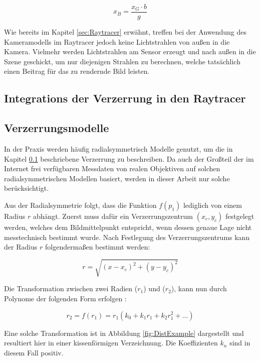 \begin{equation}
x_B = \frac{x_G \cdot b}{g}
\end{equation}

Wie bereits im Kapitel \ref{sec:Raytracer} erwähnt, treffen bei der Anwendung des Kameramodells im Raytracer jedoch keine Lichtstrahlen von außen in die Kamera. Vielmehr werden Lichtstrahlen am Sensor erzeugt und nach außen in die Szene geschickt, um nur diejenigen Strahlen zu berechnen, welche tatsächlich einen Beitrag für das zu rendernde Bild leisten.

\subsection{Integrations der Verzerrung in den Raytracer}\label{sec:DistortionRaytracer}



\subsection{Verzerrungsmodelle}
\label{subsec:verzerrungsmodelle}

In der Praxis werden häufig radialsymmetrisch Modelle genutzt, um die in Kapitel \ref{sec:DistortionRaytracer} beschriebene Verzerrung zu beschreiben. Da auch der Großteil der im Internet frei verfügbaren Messdaten von realen Objektiven auf solchen radialsymmetrischen Modellen basiert, werden in dieser Arbeit nur solche berücksichtigt.

Aus der Radialsymmetrie folgt, dass die Funktion $f(p_1)$ lediglich von einem Radius $r$ abhängt. Zuerst muss dafür ein Verzerrungszentrum $(x_c, y_c)$ festgelegt werden, welches dem Bildmittelpunkt entspricht, wenn dessen genaue Lage nicht messtechnisch bestimmt wurde. Nach Festlegung des Verzerrungszentrums kann der Radius $r$ folgendermaßen bestimmt werden:

\begin{equation}
r = \sqrt{(x- x_c)^2 + (y-y_c)^2}
\end{equation}

Die Transformation zwischen zwei Radien ($r_1$) und ($r_2$), kann nun durch Polynome der folgenden Form erfolgen \cite{TangDistortionModels}:

\begin{equation}
r_2 = f(r_1) = r_1 (k_0 + k_1r_1 + k_2r_1^2 + ...)
\label{eq:PolyRadial}
\end{equation}

Eine solche Transformation ist in Abbildung \ref{fig:DistExample} dargestellt und resultiert hier in einer kissenförmigen Verzeichnung. Die Koeffizienten $k_n$ sind in diesem Fall positiv.

